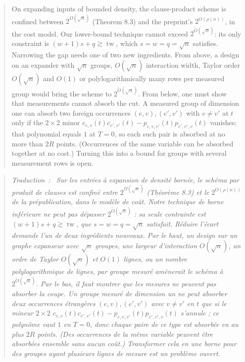 \documentclass[11pt,a4paper]{article}
\makeatletter
\theoremstyle{definition}
\theoremstyle{remark}
\newcommand{\tw}{\operatorname{tw}}
\newcommand{\englishhyph}{\@ifundefined{l@english}{}{\language\l@english}}
\newenvironment{dlquote}{\begin{quote}\englishhyph}{\end{quote}}
\newenvironment{dltrad}{\begin{quote}\itshape\textup{Traduction~:}\ \ignorespaces}{\end{quote}}
\makeatother
\begin{document}
\begin{dlquote}
On expanding inputs of bounded density, the clause-product scheme is confined between
$2^{\Omega(\sqrt n)}$ (Theorem 8.3) and the preprint's $2^{O(\rho(n))}$, in the cost model.
Our lower-bound technique cannot exceed $2^{\tilde O(\sqrt n)}$: its only constraint is
$(w+1)s+q\gtrsim\tw$, which $s=w=q=\sqrt n$ satisfies. Narrowing the gap needs one of two new
ingredients. From above, a design on an expander with $\sqrt n$ groups, $O(\sqrt n)$
interaction width, Taylor order $O(\sqrt n)$ and $O(1)$ or polylogarithmically many rows per
measured group would bring the scheme to $2^{\tilde O(\sqrt n)}$. From below, one must show
that measurements cannot absorb the cut. A measured group of dimension one can absorb two
foreign occurrences $(e,v),(e',v')$ with $v\ne v'$ at $t$ only if the $2\times2$ minor
$c_{e,v}(t)c_{e',v'}(t)-p_{e,v,v'}(t)p_{e',v',v}(t)$ vanishes; that polynomial equals $1$ at
$T=0$, so each such pair is absorbed at no more than $2R$ points. (Occurrences of the same
variable can be absorbed together at no cost.) Turning this into a bound for groups with
several measurement rows is open.
\end{dlquote}

\begin{dltrad}
Sur les entrées à expansion de densité bornée, le schéma par produit de clauses est confiné
entre $2^{\Omega(\sqrt n)}$ (Théorème 8.3) et le $2^{O(\rho(n))}$ de la prépublication, dans
le modèle de coût. Notre technique de borne inférieure ne peut pas dépasser
$2^{\tilde O(\sqrt n)}$ : sa seule contrainte est $(w+1)s+q\gtrsim\tw$, que $s=w=q=\sqrt n$
satisfait. Réduire l'écart demande l'un de deux ingrédients nouveaux. Par le haut, un design
sur un graphe expanseur avec $\sqrt n$ groupes, une largeur d'interaction $O(\sqrt n)$, un
ordre de Taylor $O(\sqrt n)$ et $O(1)$ lignes, ou un nombre polylogarithmique de lignes, par
groupe mesuré amènerait le schéma à $2^{\tilde O(\sqrt n)}$. Par le bas, il faut montrer que
les mesures ne peuvent pas absorber la coupe. Un groupe mesuré de dimension un ne peut
absorber deux occurrences étrangères $(e,v),(e',v')$ avec $v\ne v'$ en $t$ que si le mineur
$2\times2$ $c_{e,v}(t)c_{e',v'}(t)-p_{e,v,v'}(t)p_{e',v',v}(t)$ s'annule ; ce polynôme vaut
$1$ en $T=0$, donc chaque paire de ce type est absorbée en au plus $2R$ points. (Des
occurrences de la même variable peuvent être absorbées ensemble sans aucun coût.)
Transformer cela en une borne pour des groupes ayant plusieurs lignes de mesure est un
problème ouvert.
\end{dltrad}
\end{document}
